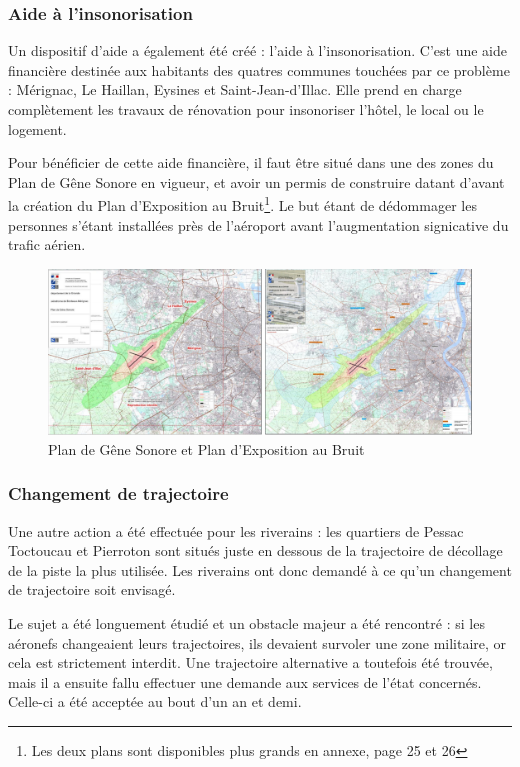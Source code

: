 \subsubsection{Aide à l'insonorisation}

Un dispositif d'aide a également été créé : l'aide à l'insonorisation.
C'est une aide financière destinée aux habitants des quatres communes touchées par ce problème : Mérignac, Le Haillan, Eysines et Saint-Jean-d'Illac. Elle prend en charge complètement les travaux de rénovation pour insonoriser l'hôtel, le local ou le logement.

Pour bénéficier de cette aide financière, il faut être situé dans une des zones du Plan de Gêne Sonore en vigueur, et avoir un permis de construire datant d'avant la création du Plan d'Exposition au Bruit\footnote{Les deux plans sont disponibles plus grands en annexe, page 25 et 26}.
Le but étant de dédommager les personnes s'étant installées près de l'aéroport avant l'augmentation signicative du trafic aérien.

\begin{figure}[hbt!]
  \centering
  \includegraphics[width=16cm]{Images/pgs_peb.png}\newline
  \caption{Plan de Gêne Sonore et Plan d'Exposition au Bruit}
  \label{fig:pgs_peb}
\end{figure}

\subsubsection{Changement de trajectoire}

Une autre action a été effectuée pour les riverains : les quartiers de Pessac Toctoucau et Pierroton sont situés juste en dessous de la trajectoire de décollage de la piste la plus utilisée. Les riverains ont donc demandé à ce qu'un changement de trajectoire soit envisagé.

Le sujet a été longuement étudié et un obstacle majeur a été rencontré : si les aéronefs changeaient leurs trajectoires, ils devaient survoler une zone militaire, or cela est strictement interdit.
Une trajectoire alternative a toutefois été trouvée, mais il a ensuite fallu effectuer une demande aux services de l'état concernés. Celle-ci a été acceptée au bout d'un an et demi.\newline

